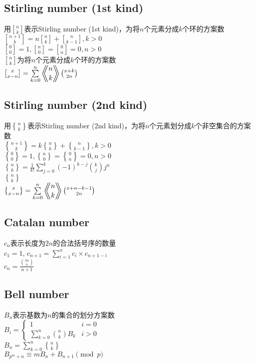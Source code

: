 	\subsection*{Stirling number (1st kind)}
		用$ {n \brack k} $表示Stirling number (1st kind)，为将$ n $个元素分成$ k $个环的方案数
		\\$ {n + 1 \brack k} = n {n \brack k} + {n \brack k - 1}, k > 0 $
		\\$ {0 \brack 0} = 1, {n \brack 0} = {0 \brack n} = 0, n > 0 $
		\\$ {n \brack k} $为将$ n $个元素分成$ k $个环的方案数
		\\$ {x \brack x - n} = \sum\limits_{k = 0}^{n} \Eularian{n}{k} \binom{x + k}{2 n} $
	\subsection*{Stirling number (2nd kind)}
		用$ {n \brace k} $表示Stirling number (2nd kind)，为将$ n $个元素划分成$ k $个非空集合的方案数
		\\$ {n + 1 \brace k} = k {n \brace k} + {n \brace k - 1}, k > 0 $
		\\$ {0 \brace 0} = 1, {n \brace 0} = {0 \brace n} = 0, n > 0 $
		\\$ {n \brace k} = \frac{1}{k!} \sum\limits_{j = 0}^{k} (-1) ^ {k - j} \binom{k}{j} j^n $
		\\$ {n \brace k} $
		\\$ {x \brace x - n} = \sum\limits_{k = 0}^{n} \Eularian{n}{k} \binom{x + n - k - 1}{2 n} $
	\subsection*{Catalan number}
		$ c_n $表示长度为$ 2n $的合法括号序的数量
		\\$ c_1 = 1 $, $ c_{n+1} = \sum\limits_{i=1}^{n} c_i \times c_{n + 1 - i} $
		\\$ c_n = \frac{\binom{2n}{n}}{n + 1} $
	\subsection*{Bell number}
		$ B_n $表示基数为$ n $的集合的划分方案数
		\\$ B_i = \begin{cases}
			1 & i = 0\\
			\sum\limits_{k = 0}^{n} \binom{n}{k} B_k & i > 0
		\end{cases} $
		\\$ B_n = \sum\limits_{k = 0}^{n} {n \brace k} $
		\\$ B_{p^m + n} \equiv m B_n + B_{n + 1} \pmod p $
